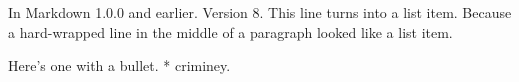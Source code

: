 In Markdown 1.0.0 and earlier. Version 8. This line turns into a list item. Because a hard-wrapped line in the middle of a paragraph looked like a list item.

Here's one with a bullet. * criminey.